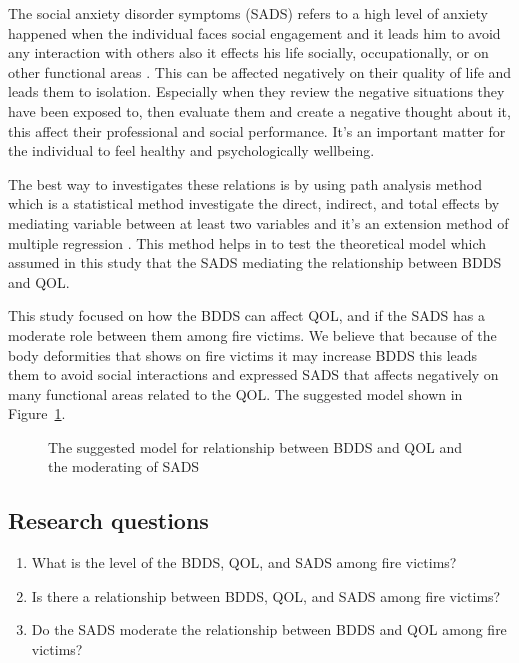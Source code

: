 \documentclass{NSP1}
\begin{document}
The social anxiety disorder symptoms (SADS) refers to a high level of anxiety happened when the individual faces social engagement and it leads him to avoid any interaction with others also it effects his life socially, occupationally, or on other functional areas \cite{APA2013}. This can be affected negatively on their quality of life and leads them to isolation. Especially when they review the negative situations they have been exposed to, then evaluate them and create a negative thought about it, this affect their professional and social performance. It's an important matter for the individual to feel healthy and psychologically wellbeing.

The best way to investigates these relations is by using path analysis method which is a statistical method investigate the direct, indirect, and total effects by mediating variable between at least two variables and it's an extension method of multiple regression \cite{Columbia2026}. This method helps in to test the theoretical model which assumed in this study that the SADS mediating the relationship between BDDS and QOL.

This study focused on how the BDDS can affect QOL, and if the SADS has a moderate role between them among fire victims. We believe that because of the body deformities that shows on fire victims it may increase BDDS this leads them to avoid social interactions and expressed SADS that affects negatively on many functional areas related to the QOL. The suggested model shown in Figure~\ref{fig:suggested}.

\begin{figure}[!ht]
\centering
{}
\caption{The suggested model for relationship between BDDS and QOL and the moderating of SADS}
\label{fig:suggested}
\end{figure}

\subsection{Research questions}
\begin{enumerate}
\item What is the level of the BDDS, QOL, and SADS among fire victims?
\item Is there a relationship between BDDS, QOL, and SADS among fire victims?
\item Do the SADS moderate the relationship between BDDS and QOL among fire victims?
\end{enumerate}
\end{document}
